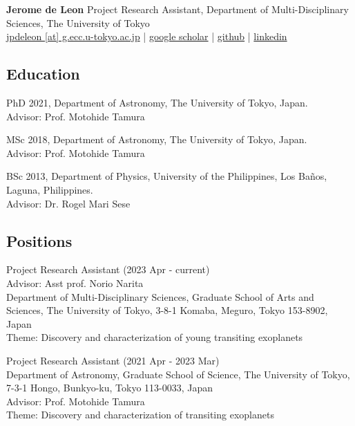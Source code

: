 \documentclass[12pt,letterpaper]{article}
\begin{document}
\thispagestyle{empty}\sloppy\sloppypar\raggedbottom

\textbf{\Large Jerome de Leon} 
Project Research Assistant, Department of Multi-Disciplinary Sciences, The University of Tokyo \\
\textsf{\small 
    \href{mailto:jpdeleon@g.ecc.u-tokyo.ac.jp}{jpdeleon [at] g.ecc.u-tokyo.ac.jp} | %
    \href{https://scholar.google.com/citations?hl=en&user=_Z8ialwAAAAJ&view_op=list_works&sortby=pubdate}{google scholar} | %
    \href{https://github.com/jpdeleon}{github} | %
    \href{https://www.linkedin.com/in/jpdeleonbsap/}{linkedin} %
}\\[0.5ex]

\subsection{Education}
\begin{list}{}{\cvlist}
  \item
        PhD 2021, Department of Astronomy, The University of Tokyo, Japan.\\Advisor: Prof. Motohide Tamura
  \item
        MSc 2018, Department of Astronomy, The University of Tokyo, Japan.\\Advisor: Prof. Motohide Tamura
  \item
        BSc 2013, Department of Physics, University of the Philippines, Los Ba\~nos, Laguna, Philippines.\\Advisor: Dr. Rogel Mari Sese      
\end{list}

\subsection{Positions}
\begin{list}{}{\cvlist}
  \item
      Project Research Assistant (2023 Apr - current) \\
      Advisor: Asst prof. Norio Narita \\
      Department of Multi-Disciplinary Sciences, Graduate School of Arts and Sciences, The University of Tokyo, 3-8-1 Komaba, Meguro, Tokyo 153-8902, Japan \\
      Theme: Discovery and characterization of young transiting exoplanets \\
  
  \item
      Project Research Assistant (2021 Apr - 2023 Mar) \\
      Department of Astronomy, Graduate School of Science, The University of Tokyo, 7-3-1 Hongo, Bunkyo-ku, Tokyo 113-0033, Japan \\
      Advisor: Prof. Motohide Tamura \\
      Theme: Discovery and characterization of transiting exoplanets \\

  \item

\end{list}
\end{document}
